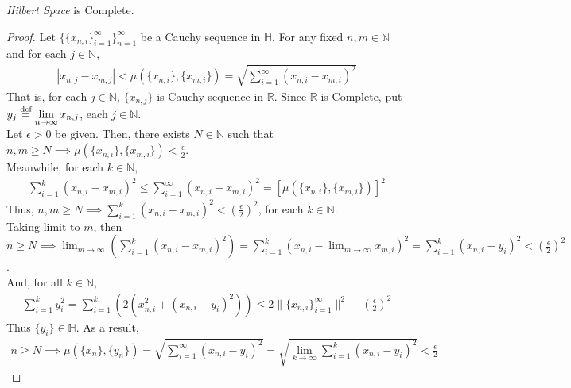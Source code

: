 \documentclass[11pt]{article}
\theoremstyle{romanstyle}
\newcommand{\dis}{\displaystyle}
\newcommand{\defequal}{\overset{\textnormal{def}}{=}}
\begin{document}
\begin{theorem}
    \textit{Hilbert Space} is Complete.
\end{theorem}
\begin{proof}
    Let $\{ \{x_{n,i} \}_{i=1}^\infty \}_{n=1}^\infty$ be a Cauchy sequence in $\mathbb{H}$. For any fixed $n,m \in \mathbb{N}$ and for each $j \in \mathbb{N}$,
    \begin{align*}
        |x_{n,j} - x_{m,j}| < \mu(\{x_{n,i}\}, \{x_{m,i}\})
        = \sqrt{\sum_{i=1}^{\infty} (x_{n,i} - x_{m,i})^2}
    \end{align*}
    That is, for each $j \in \mathbb{N}$, $\{x_{n,j}\}$ is Cauchy sequence in $\mathbb{R}$. Since $\mathbb{R}$ is Complete,
    put $\dis y_j \defequal \lim_{n \to \infty} x_{n,j}$, each $j \in \mathbb{N}$. \\
    Let $\epsilon > 0$ be given. Then, there exists $N \in \mathbb{N}$ such that $n,m \geq N \implies \dis \mu(\{x_{n,i}\}, \{x_{m,i}\}) < \frac{\epsilon}{2}$. \\
    Meanwhile, for each $k \in \mathbb{N}$,
    \begin{align*}
        \sum_{i=1}^{k} (x_{n,i} - x_{m,i})^2 \leq \sum_{i=1}^{\infty} (x_{n,i} - x_{m,i})^2 = \left[\mu(\{x_{n,i}\}, \{x_{m,i}\})\right]^2
    \end{align*}
    Thus, $n,m \geq N \implies \dis \sum_{i=1}^{k} (x_{n,i} - x_{m,i})^2 < \left( \frac{\epsilon}{2} \right)^2$, for each $ k \in \mathbb{N}$.\\
    Taking limit to $m$, then $n \geq N \implies \dis \lim_{m \to \infty} \left(\sum_{i=1}^{k} (x_{n,i} - x_{m,i})^2 \right) = \sum_{i=1}^{k} \left(x_{n,i} - \lim_{m \to \infty} x_{m,i}\right)^2 = \sum_{i=1}^{k} (x_{n,i} - y_i)^2 < \left(\frac{\epsilon}{2}\right)^2$.\\
    And, for all $k \in \mathbb{N}$,
    \begin{align*}
        \sum_{i=1}^{k} y_i^2 = \sum_{i=1}^{k} (2(x_{n,i}^2 + (x_{n,i} - y_i)^2)) \leq 2\|\{x_{n,i}\}_{i=1}^\infty \|^2 + \left(\frac{\epsilon}{2}\right)^2
    \end{align*}
    Thus $\{y_i\} \in \mathbb{H}$. As a result,
    \begin{align*}
        n \geq N \implies \mu(\{x_n\}, \{y_n\})
        = \sqrt{\sum_{i=1}^{\infty} (x_{n,i} - y_i)^2}
        = \sqrt{\lim_{k \to \infty} \sum_{i=1}^{k} (x_{n,i} - y_i)^2}
        < \frac{\epsilon}{2}
    \end{align*}
\end{proof}
\end{document}
